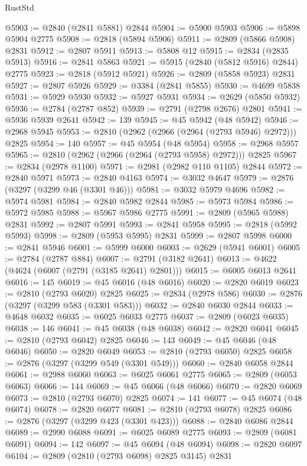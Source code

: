 \begin{lexlean}{RustStd}
\begin{coremodule}
{\begin{coremodule}
{{{{{{{{{{{{{{{{{{{{{{{{{{{{{{{{{@5903 := @2840 (@2841 @5881) @2844
@5904 := @5900 @5903
@5906 := @5898 @5904 @2775
@5908 := @2818 (@5894 @5906)
@5911 := @2809 (@5866 @5908) @2831
@5912 := @2807 @5911
@5913 := @5808 @12
@5915 := @2834 (@2835 @5913)
@5916 := @2841 @5863
@5921 := @5915 (@2840 (@5812 @5916) @2844) @2775
@5923 := @2818 (@5912 @5921)
@5926 := @2809 (@5858 @5923) @2831
@5927 := @2807 @5926
@5929 := @3384 (@2841 @5855)
@5930 := @4699 @5838
@5931 := @5929 @5930
@5932 := @5927 @5931
@5934 := @2629 (@5850 @5932)
@5936 := @2784 (@2787 @852)
@5939 := @2791 (@2798 @2676) @2801
@5941 := @5936 @5939 @2641
@5942 := 139
@5945 := @45 @5942 (@48 @5942)
@5946 := @2968 @5945
@5953 := @2810 (@2962 (@2966 (@2964 (@2793 @5946) @2972))) @2825
@5954 := 140
@5957 := @45 @5954 (@48 @5954)
@5958 := @2968 @5957
@5965 := @2810 (@2962 (@2966 (@2964 (@2793 @5958) @2972))) @2825
@5967 := @2834 (@2978 @1100)
@5971 := @2981 (@2982 @110 @1105) @2844
@5972 := @2840 @5971
@5973 := @2840 @4163
@5974 := @3032 @4647
@5979 := @2876 (@3297 (@3299 @46 (@3301 @46)))
@5981 := @3032 @5979 @4696
@5982 := @5974 @5981
@5984 := @2840 @5982 @2844
@5985 := @5973 @5984
@5986 := @5972 @5985
@5988 := @5967 @5986 @2775
@5991 := @2809 (@5965 @5988) @2831
@5992 := @2807 @5991
@5993 := @2841 @5958
@5995 := @2818 (@5992 @5993)
@5998 := @2809 (@5953 @5995) @2831
@5999 := @2807 @5998
@6000 := @2841 @5946
@6001 := @5999 @6000
@6003 := @2629 (@5941 @6001)
@6005 := @2784 (@2787 @884)
@6007 := @2791 (@3182 @2641)
@6013 := @4622 (@4624 (@6007 (@2791 (@3185 @2641) @2801)))
@6015 := @6005 @6013 @2641
@6016 := 145
@6019 := @45 @6016 (@48 @6016)
@6020 := @2820 @6019
@6023 := @2810 (@2793 @6020) @2825
@6025 := @2834 (@2978 @586)
@6030 := @2876 (@3297 (@3299 @583 (@3301 @583)))
@6032 := @2840 @6030 @2844
@6033 := @4648 @6032
@6035 := @6025 @6033 @2775
@6037 := @2809 (@6023 @6035)
@6038 := 146
@6041 := @45 @6038 (@48 @6038)
@6042 := @2820 @6041
@6045 := @2810 (@2793 @6042) @2825
@6046 := 143
@6049 := @45 @6046 (@48 @6046)
@6050 := @2820 @6049
@6053 := @2810 (@2793 @6050) @2825
@6058 := @2876 (@3297 (@3299 @549 (@3301 @549)))
@6060 := @2840 @6058 @2844
@6061 := @2988 @6060
@6063 := @6025 @6061 @2775
@6065 := @2809 (@6053 @6063)
@6066 := 144
@6069 := @45 @6066 (@48 @6066)
@6070 := @2820 @6069
@6073 := @2810 (@2793 @6070) @2825
@6074 := 141
@6077 := @45 @6074 (@48 @6074)
@6078 := @2820 @6077
@6081 := @2810 (@2793 @6078) @2825
@6086 := @2876 (@3297 (@3299 @423 (@3301 @423)))
@6088 := @2840 @6086 @2844
@6089 := @2990 @6088
@6091 := @6025 @6089 @2775
@6093 := @2809 (@6081 @6091)
@6094 := 142
@6097 := @45 @6094 (@48 @6094)
@6098 := @2820 @6097
@6104 := @2809 (@2810 (@2793 @6098) @2825 @3145) @2831
}}}}}}}}}}}}}}}}}}}}}}}}}}}}}}}}}
\end{coremodule}}
\end{coremodule}
\end{lexlean}
